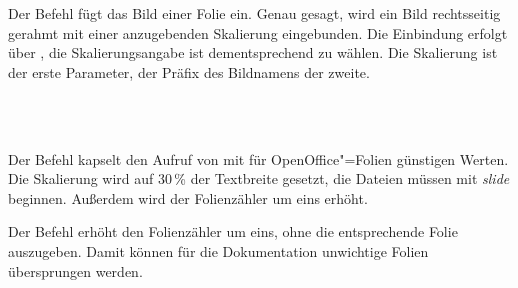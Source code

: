 \DescribeMacro{\insertslide}
Der Befehl  fügt das Bild einer Folie ein.
Genau gesagt, wird ein Bild rechtsseitig gerahmt mit einer anzugebenden Skalierung eingebunden.
Die Einbindung erfolgt über , die Skalierungsangabe ist dementsprechend zu wählen.
Die Skalierung ist der erste Parameter, der Präfix des Bildnamens der zweite.

\begin{nutzung}
		\>\\
	\beispiel
		\>\\
		\>
\end{nutzung}

\DescribeMacro{\nextslide}
Der Befehl  kapselt den Aufruf von  mit für OpenOffice"=Folien günstigen Werten.
Die Skalierung wird auf 30\,\% der Textbreite gesetzt, die Dateien müssen mit \emph{slide} beginnen.
Außerdem wird der Folienzähler um eins erhöht.

\begin{nutzung}
		\>
\end{nutzung}

\DescribeMacro{\nextslidesilent}
Der Befehl  erhöht den Folienzähler um eins, ohne die entsprechende Folie auszugeben.
Damit können \zB für die Dokumentation unwichtige Folien übersprungen werden.

\begin{nutzung}
		\>
\end{nutzung}



